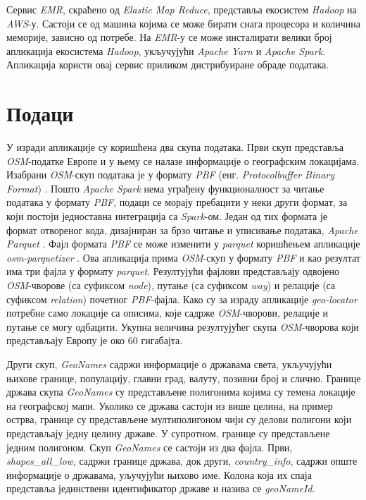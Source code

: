 \documentclass[12pt,oneside]{memoir}
\begin{document}
Сервис \textit{EMR}, скраћено од \textit{Elastic Map Reduce}, представља екосистем \textit{Hadoop} на \textit{AWS}-у. Састоји се од машина којима се може бирати снага процесора и количина меморије, зависно од потребе. На \textit{EMR}-у се може инсталирати велики број апликација екосистема \textit{Hadoop}, укључујући \textit{Apache Yarn} и \textit{Apache Spark}. Апликација користи овај сервис приликом дистрибуиране обраде података.
 
\section{Подаци}
\label{sec:osm_spark_podaci}

У изради апликације су коришћена два скупа података. Први скуп представља \textit{OSM}-податке Европе и у њему се налазе информације о географским локацијама. Изабрани \textit{OSM}-скуп података је у формату \textit{PBF} (енг. \textit{Protocolbuffer Binary Format}) \cite{osm_pbf_format}. Пошто \textit{Apache Spark} нема уграђену функционалност за читање података у формату \textit{PBF}, подаци се морају пребацити у неки други формат, за који постоји једноставна интеграција са \textit{Spark}-ом. Један од тих формата је формат отвореног кода, дизајниран за брзо читање и уписивање података, \textit{Apache Parquet} \cite{apache_parquet}. Фајл формата \textit{PBF} се може изменити у \textit{parquet} коришћењем апликације \textit{osm-parquetizer} \cite{osm_parquetizer}. Ова апликација прима \textit{OSM}-скуп у формату \textit{PBF} и као резултат има три фајла у формату \textit{parquet}. Резултујући фајлови представљају одвојено  \textit{OSM}-чворове (са суфиксом \textit{node}), путање (са суфиксом \textit{way}) и релације (са суфиксом \textit{relation}) почетног \textit{PBF}-фајла. Како су за израду апликације \textit{geo-locator} потребне само локације са описима, које садрже \textit{OSM}-чворови, релације и путање се могу одбацити. Укупна величина резултујућег скупа \textit{OSM}-чворова који представљају Европу је око 60 гигабајта.

Други скуп, \textit{GeoNames} \cite{geonames} садржи информације о државама света, укључујући њихове границе, популацију, главни град, валуту, позивни број и слично. Границе држава скупа \textit{GeoNames} су представљене полигонима којима су темена локације на географској мапи. Уколико се држава састоји из више целина, на пример острва, границе су представљене мултиполигоном чији су делови полигони који представљају једну целину државе. У супротном, границе су представљене једним полигоном. Скуп \textit{GeoNames} се састоји из два фајла. Први, \textit{shapes\_all\_low}, садржи границе држава, док други, \textit{country\_info}, садржи опште информације о државама, уључујући њихово име. Колона која их спаја представља јединствени идентификатор државе и назива се \textit{geoNameId}.
\end{document}
